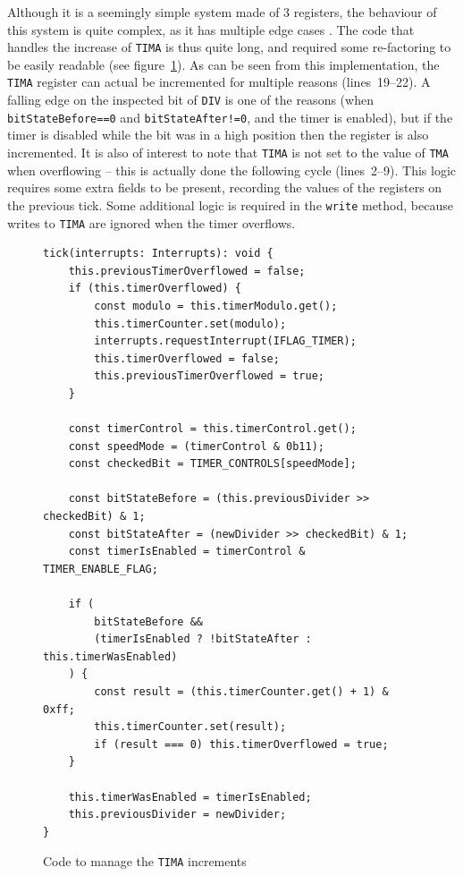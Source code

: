 \documentclass[11pt]{informatics-report}
\begin{document}
Although it is a seemingly simple system made of 3 registers, the behaviour of this system is quite complex, as it has multiple edge cases \cite[Timer obscure behaviour]{pandoc}. The code that handles the increase of \texttt{TIMA} is thus quite long, and required some re-factoring to be easily readable (see figure~\ref{fig:tima-increase}). As can be seen from this implementation, the \texttt{TIMA} register can actual be incremented for multiple reasons (lines~19--22). A falling edge on the inspected bit of \texttt{DIV} is one of the reasons (when \texttt{bitStateBefore==0} and \texttt{bitStateAfter!=0}, and the timer is enabled), but if the timer is disabled while the bit was in a high position then the register is also incremented. It is also of interest to note that \texttt{TIMA} is not set to the value of \texttt{TMA} when overflowing -- this is actually done the following cycle (lines~2--9). This logic requires some extra fields to be present, recording the values of the registers on the previous tick. Some additional logic is required in the \texttt{write} method, because writes to \texttt{TIMA} are ignored when the timer overflows.

\begin{figure}[h]
    \begin{verbatim}
tick(interrupts: Interrupts): void {
    this.previousTimerOverflowed = false;
	if (this.timerOverflowed) {
        const modulo = this.timerModulo.get();
        this.timerCounter.set(modulo);
        interrupts.requestInterrupt(IFLAG_TIMER);
        this.timerOverflowed = false;
        this.previousTimerOverflowed = true;
    }

    const timerControl = this.timerControl.get();
    const speedMode = (timerControl & 0b11);
    const checkedBit = TIMER_CONTROLS[speedMode];

    const bitStateBefore = (this.previousDivider >> checkedBit) & 1;
    const bitStateAfter = (newDivider >> checkedBit) & 1;
    const timerIsEnabled = timerControl & TIMER_ENABLE_FLAG;

    if (
        bitStateBefore &&
        (timerIsEnabled ? !bitStateAfter : this.timerWasEnabled)
    ) {
        const result = (this.timerCounter.get() + 1) & 0xff;
        this.timerCounter.set(result);
        if (result === 0) this.timerOverflowed = true;
    }

    this.timerWasEnabled = timerIsEnabled;
    this.previousDivider = newDivider;
}
    \end{verbatim}
    \caption{Code to manage the \texttt{TIMA} increments}
    \label{fig:tima-increase}
\end{figure}
\end{document}
